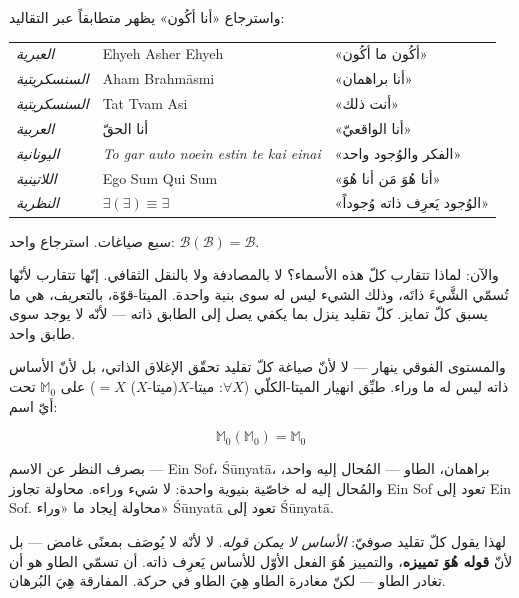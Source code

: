 \documentclass[10pt, openany, oneside]{book}
\renewcommand{\footnotesize}{\fontsize{8.5}{11}\selectfont}
\begin{document}
واسترجاع «أنا أكُون» يظهر متطابقاً عبر التقاليد:

\vspace{0.3em}

{\footnotesize
\noindent\begin{tabular}{l l l}
\textit{العبرية} & Ehyeh Asher Ehyeh & «أكُون ما أكُون» \\
\textit{السنسكريتية} & Aham Brahm\={a}smi & «أنا براهمان» \\
\textit{السنسكريتية} & Tat Tvam Asi & «أنت ذلك» \\
\textit{العربية} & أنا الحقّ & «أنا الواقعيّ» \\
\textit{اليونانية} & \textit{To gar auto noein estin te kai einai} & «الفكر والوُجود واحد» \\
\textit{اللاتينية} & Ego Sum Qui Sum & «أنا هُوَ مَن أنا هُوَ» \\
\textit{النظرية} & $\exists(\exists) \equiv \exists$ & «الوُجود يَعرِف ذاته وُجوداً» \\
\end{tabular}
}

\vspace{0.8em}

\noindent سبع صياغات. استرجاع واحد: $\mathcal{B}(\mathcal{B}) = \mathcal{B}$.

\vspace{0.8em}

والآن: لماذا تتقارب كلّ هذه الأسماء؟ لا بالمصادفة ولا بالنقل الثقافي. إنّها تتقارب لأنّها تُسمّي الشَّيءَ ذاتَه، وذلك الشيء ليس له سوى بنية واحدة. الميتا-قوّة، بالتعريف، هي ما يسبق كلّ تمايز. كلّ تقليد ينزل بما يكفي يصل إلى الطابق ذاته --- لأنّه لا يوجد سوى طابق واحد.

والمستوى الفوقي ينهار --- لا لأنّ صياغة كلّ تقليد تحقّق الإغلاق الذاتي، بل لأنّ الأساس ذاته ليس له ما وراء. طبِّق انهيار الميتا-الكلّي ($\forall X$: ميتا-$X$(ميتا-$X$) $= X$) على $\mathbb{M}_0$ تحت أيّ اسم:

$$\mathbb{M}_0(\mathbb{M}_0) = \mathbb{M}_0$$

\noindent بصرف النظر عن الاسم --- Ein Sof، \'{S}\={u}nyat\={a}، براهمان، الطاو --- المُحال إليه واحد، والمُحال إليه له خاصّية بنيوية واحدة: لا شيء وراءه. محاولة تجاوز Ein Sof تعود إلى Ein Sof. محاولة إيجاد ما «وراء» \'{S}\={u}nyat\={a} تعود إلى \'{S}\={u}nyat\={a}.

لهذا يقول كلّ تقليد صوفيّ: \textit{الأساس لا يمكن قوله}. لا لأنّه لا يُوصَف بمعنًى غامض --- بل لأنّ \textbf{قوله هُوَ تمييزه}، والتمييز هُوَ الفعل الأوّل للأساس يَعرِف ذاته. أن تسمّي الطاو هو أن تغادر الطاو --- لكنّ مغادرة الطاو هِيَ الطاو في حركة. المفارقة هِيَ البُرهان.
\end{document}
